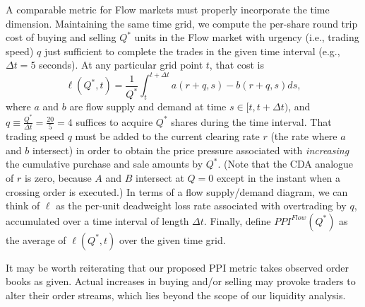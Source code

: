 A comparable metric for Flow markets must properly incorporate the time dimension. 
Maintaining the same time grid, we compute the per-share
round trip cost of buying and selling $Q^*$ units in the Flow market with urgency (i.e., trading speed) $q$ just sufficient to complete the trades in the given time interval (e.g., $\Delta t = 5$ seconds).  
At any particular grid point $t$, that cost is
\begin{equation} \label{eq:ppiflow}
  \ell (Q^*,t) = \frac{1}{Q^*}\int_t^{t+\Delta t} a(r+q,s) - b(r+q,s) ds,
\end{equation}
where $a$ and $b$ are flow supply and demand at time $s \in [t, t+\Delta t)$, and 
$q \equiv \frac{Q^*}{\Delta t}=\frac{20}{5}=4$ 
suffices to acquire $Q^*$ shares during the time interval. 
That trading speed $q$ must be added to the current clearing rate $r$ (the rate where $a$ and $b$ intersect) in order to obtain the price pressure associated with \textit{increasing} the cumulative purchase and sale amounts by $Q^*$.
(Note that the CDA analogue of $r$ is zero, because $A$ and $B$ intersect at $Q=0$ except in the instant when a crossing order is executed.)
In terms of a flow supply/demand diagram, we can think of $\ell$ as the per-unit deadweight loss rate associated with overtrading by $q$, accumulated over a time interval of length $\Delta t.$ 
Finally, define 
$PPI^{Flow}(Q^*)$ as the average of $\ell(Q^*,t)$ over the given time grid.

It may be worth reiterating that our proposed PPI metric takes observed order books as given. Actual increases in buying and/or selling may provoke traders to alter their order streams, which lies beyond the scope of our liquidity analysis.



